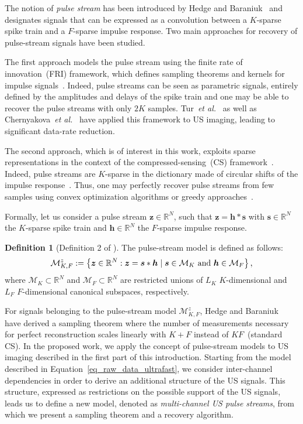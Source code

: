 \documentclass{article}
\newcommand{\etal}{\textit{et al.}}
\newcommand{\vect}[1]{\bm{#1}}
\theoremstyle{definition}
\newtheorem{defn}{Definition}
\begin{document}
The notion of \textit{pulse stream} has been introduced by Hedge and Baraniuk~\cite{Hedge_TSP_2011} and designates signals that can be expressed as a convolution between a $K$-sparse spike train and a $F$-sparse impulse response. Two main approaches for recovery of pulse-stream signals have been studied. 

The first approach models the pulse stream using the finite rate of innovation~(FRI) framework, which defines sampling theorems and kernels for impulse signals~\cite{Vetterli_TSP_2002}. Indeed, pulse streams can be seen as parametric signals, entirely defined by the amplitudes and delays of the spike train and one may be able to recover the pulse streams with only $2K$ samples. Tur~\etal{}~\cite{Tur_TSP_2012} as well as Chernyakova~\etal{}~\cite{Chernyakova2014} have applied this framework to US imaging, leading to significant data-rate reduction.

The second approach, which is of interest in this work, exploits sparse representations in the context of the compressed-sensing~(CS) framework~\cite{Candes_SPM_2008}. Indeed, pulse streams are $K$-sparse in the dictionary made of circular shifts of the impulse response~\cite{Naini_ICASSP_2009}. Thus, one may perfectly recover pulse streams from few samples using convex optimization algorithms or greedy approaches~\cite{Hedge_TSP_2011, Naini_ICASSP_2009, Tsagkatakis_ICASSP_2014}.

Formally, let us consider a pulse stream $\vect{z} \in \mathbb{R}^N$, such that $\vect{z} = \vect{h} \ast \vect{s}$ with $\vect{s} \in \mathbb{R}^N$ the $K$-sparse spike train and $\vect{h} \in \mathbb{R}^N$ the $F$-sparse impulse response.
\begin{defn}[Definition 2 of \cite{Hedge_TSP_2011}]	
The pulse-stream model is defined as follows:
\begin{equation}
\label{eq_pulse_stream_model}
\mathcal{M}^z_{K,F}:=\left\lbrace \vect{z} \in \mathbb{R}^N: \vect{z} = \vect{s} \ast \vect{h} \; | \; \vect{s} \in \mathcal{M}_K \textnormal{ and } \vect{h} \in \mathcal{M}_F \right \rbrace,
\end{equation}
where $\mathcal{M}_K \subset \mathbb{R}^N$ and $\mathcal{M}_F \subset \mathbb{R}^N$ are restricted unions of $L_K$ $K$-dimensional and $L_F$ $F$-dimensional canonical subspaces, respectively.
\end{defn} 


For signals belonging to the pulse-stream model $\mathcal{M}^z_{K,F}$, Hedge and Baraniuk~\cite{Hedge_TSP_2011} have derived a sampling theorem where the number of measurements necessary for perfect reconstruction scales linearly with $K + F$ instead of $KF$~(standard CS). In the proposed work, we apply the concept of pulse-stream models to US imaging described in the first part of this introduction. Starting from the model described in Equation~\eqref{eq_raw_data_ultrafast}, we consider inter-channel dependencies in order to derive an additional structure of the US signals. This structure, expressed as restrictions on the possible support of the US signals, leads us to define a new model, denoted as \textit{multi-channel US pulse streams}, from which we present a sampling theorem and a recovery algorithm.
\end{document}
